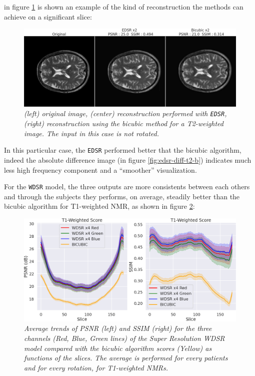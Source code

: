 \documentclass[12pt,a4paper]{report}
\begin{document}
in figure \ref{fig:edsr-upscale-t2} is shown an example of the kind of reconstruction the methods can achieve on a significant slice:

\begin{figure}[H]
  \centering 
  \includegraphics[scale=0.3]{./images/EDSR_comp_images_t2.png}
  \caption{\it (left) original image, (center) reconstruction performed with {\tt EDSR}, (right) reconstruction using the bicubic method for a T2-weighted image. The input in this case is not rotated.}
 \label{fig:edsr-upscale-t2}
\end{figure}

In this particular case, the {\tt EDSR} performed better that the bicubic algorithm, indeed the absolute difference image (in figure \ref{fig:edsr-diff-t2-b}) indicates much less high frequency component and a ``smoother'' visualization. 

For the {\tt WDSR} model, the three outputs are more consistents between each others and through the subjects they performs, on average, steadily better than the bicubic algorithm for T1-weighted NMR, as shown in figure \ref{fig:wdsr-score-slide-t1}:    

\begin{figure}[H]
  \centering
 \includegraphics[scale=0.37]{./images/WDSR_score_slide_t1_all.png}
  \caption{\it Average trends of PSNR (left) and SSIM (right) for the three channels (Red, Blue, Green lines) of the Super Resolution WDSR model compared with the bicubic algorithm scores (Yellow) as functions of the slices. The average is performed for every patients and for every rotation, for T1-weighted NMRs.}
 \label{fig:wdsr-score-slide-t1}
\end{figure}
\end{document}
